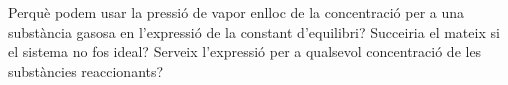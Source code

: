 \begin{exr}{}
Perquè podem usar la pressió de vapor enlloc de la concentració per a una substància gasosa en l'expressió de la constant d'equilibri?
Succeiria el mateix si el sistema no fos ideal? Serveix l'expressió per a qualsevol concentració de les substàncies reaccionants?
\end{exr}
